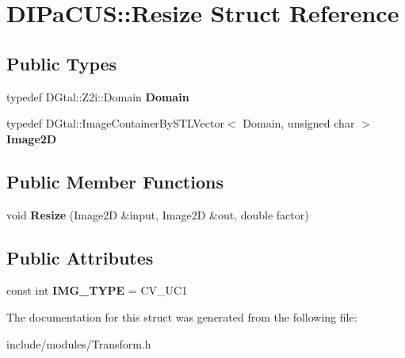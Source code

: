 \hypertarget{structDIPaCUS_1_1Resize}{}\section{D\+I\+Pa\+C\+US\+:\+:Resize Struct Reference}
\label{structDIPaCUS_1_1Resize}
\subsection*{Public Types}
\begin{DoxyCompactItemize}
\item 
\mbox{\label{structDIPaCUS_1_1Resize_a44a8c5587cd9a4f198239d3f442dbb41}} 
typedef D\+Gtal\+::\+Z2i\+::\+Domain {\bfseries Domain}
\item 
\mbox{\label{structDIPaCUS_1_1Resize_a3fe370637b71d5a54db0519675845252}} 
typedef D\+Gtal\+::\+Image\+Container\+By\+S\+T\+L\+Vector$<$ Domain, unsigned char $>$ {\bfseries Image2D}
\end{DoxyCompactItemize}
\subsection*{Public Member Functions}
\begin{DoxyCompactItemize}
\item 
\mbox{\label{structDIPaCUS_1_1Resize_aeeceb4e27f8c7012c38d76c93f661b8c}} 
void {\bfseries Resize} (Image2D \&input, Image2D \&out, double factor)
\end{DoxyCompactItemize}
\subsection*{Public Attributes}
\begin{DoxyCompactItemize}
\item 
\mbox{\label{structDIPaCUS_1_1Resize_a770d760ec0ac063a3a7a4c8dbc2df7da}} 
const int {\bfseries I\+M\+G\+\_\+\+T\+Y\+PE} = C\+V\+\_\+U\+C1
\end{DoxyCompactItemize}


The documentation for this struct was generated from the following file\+:\begin{DoxyCompactItemize}
\item 
include/modules/Transform.\+h\end{DoxyCompactItemize}
